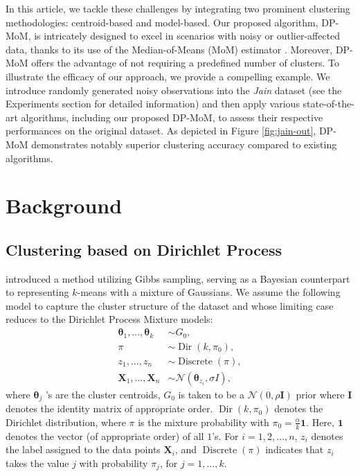 \documentclass[12pt]{article}
\newcommand{\bX}{\boldsymbol{X}}
\begin{document}
In this article, we tackle these challenges by integrating two prominent clustering methodologies: centroid-based and model-based. Our proposed algorithm, DP-MoM, is intricately designed to excel in scenarios with noisy or outlier-affected data, thanks to its use of the Median-of-Means (MoM) estimator \cite{nemirovsky1983wiley,devroye-MoM}. Moreover, DP-MoM offers the advantage of not requiring a predefined number of clusters. To illustrate the efficacy of our approach, we provide a compelling example. We introduce randomly generated noisy observations into the \textit{Jain} dataset \cite{jain-dataset} (see the Experiments section for detailed information) and then apply various state-of-the-art algorithms, including our proposed DP-MoM, to assess their respective performances on the original dataset. As depicted in Figure \ref{fig:jain-out}, DP-MoM demonstrates notably superior clustering accuracy compared to existing algorithms.

\section{Background}
\label{gen_inst}

\subsection{Clustering based on Dirichlet Process}

\cite{DP-Means} introduced a method utilizing Gibbs sampling, serving as a Bayesian counterpart to representing $k$-means with a mixture of Gaussians. We assume the following model to capture the cluster structure of the dataset and whose limiting case reduces to the Dirichlet Process Mixture models:
\begin{align*}
\boldsymbol{\theta}_1, \ldots, \boldsymbol{\theta}_{{k}} & \sim {G}_0, \\
\pi & \sim \operatorname{Dir}\left({k}, \pi_0\right), \\
{z}_1, \ldots, {z}_{{n}} & \sim \operatorname{Discrete}(\pi), \\
{\bX}_1, \ldots, {\bX}_{{n}} & \sim \mathcal{N}\left(\boldsymbol{\theta}_{{z}_{{i}}}, \sigma I\right),
\end{align*}
where $\boldsymbol{\theta}_{{j}}$ 's are the cluster centroids, ${G}_0$ is taken to be a $\mathcal{N}(0, \rho \mathbf{I})$ prior where $\mathbf{I}$ denotes the identity matrix of appropriate order. $\operatorname{Dir}\left({k}, \pi_0\right)$ denotes the Dirichlet distribution, where $\pi$ is the mixture probability with $\pi_0=\frac{\alpha}{k} \mathbf{1}$. Here, $\mathbf{1}$  denotes the vector (of appropriate order) of all $1$'s. For $i = 1,2,\ldots,n$, ${z}_{{i}}$ denotes the label assigned to the data points ${\bX}_{{i}}$, and  $\operatorname{Discrete}(\pi)$ indicates that ${z}_{{i}}$ takes the value $j$ with probability $\pi_{{j}}$, for ${j}=1, \ldots, {k}$.
\end{document}
